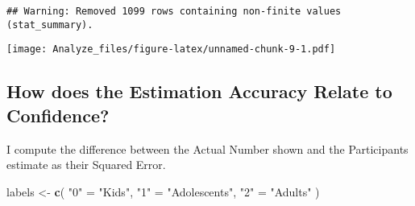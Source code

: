 \documentclass[]{article}
\newenvironment{Shaded}{\begin{snugshade}}{\end{snugshade}}
\newcommand{\KeywordTok}[1]{\textcolor[rgb]{0.13,0.29,0.53}{\textbf{#1}}}
\newcommand{\StringTok}[1]{\textcolor[rgb]{0.31,0.60,0.02}{#1}}
\newcommand{\NormalTok}[1]{#1}
\begin{document}
\begin{verbatim}
## Warning: Removed 1099 rows containing non-finite values (stat_summary).
\end{verbatim}

\texttt{[image: Analyze\_files/figure-latex/unnamed-chunk-9-1.pdf]}

\subsection{How does the Estimation Accuracy Relate to
Confidence?}\label{how-does-the-estimation-accuracy-relate-to-confidence}

I compute the difference between the Actual Number shown and the
Participants estimate as their Squared Error.

\begin{Shaded}
\begin{Highlighting}[]
\NormalTok{labels <-}\StringTok{ }\KeywordTok{c}\NormalTok{(}
  \StringTok{"0"}\NormalTok{ =}\StringTok{ "Kids"}\NormalTok{,}
  \StringTok{"1"}\NormalTok{ =}\StringTok{ "Adolescents"}\NormalTok{,}
  \StringTok{"2"}\NormalTok{ =}\StringTok{ "Adults"}
\NormalTok{)}


\end{Highlighting}
\end{Shaded}
\end{document}
